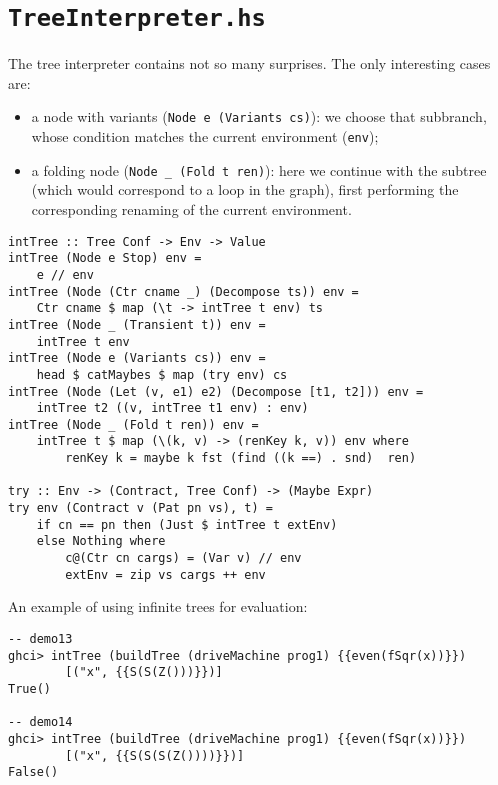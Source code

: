 \section{\texttt{TreeInterpreter.hs}}

The tree interpreter contains not so many surprises.
The only interesting cases are:
\begin{itemize}
\item a node with variants (\texttt{Node e (Variants cs)}): we choose that
subbranch, whose condition matches the current environment (\texttt{env});
\item a folding node (\texttt{Node \_ (Fold t ren)}): 
here we continue with the subtree (which would correspond to a loop in the graph),
first performing the corresponding renaming of the current environment.
\end{itemize}

\begin{lstlisting}[name=treeinterpreter]
intTree :: Tree Conf -> Env -> Value
intTree (Node e Stop) env =
	e // env
intTree (Node (Ctr cname _) (Decompose ts)) env =
	Ctr cname $ map (\t -> intTree t env) ts
intTree (Node _ (Transient t)) env =
	intTree t env
intTree (Node e (Variants cs)) env =
	head $ catMaybes $ map (try env) cs
intTree (Node (Let (v, e1) e2) (Decompose [t1, t2])) env =
	intTree t2 ((v, intTree t1 env) : env)
intTree (Node _ (Fold t ren)) env =
	intTree t $ map (\(k, v) -> (renKey k, v)) env where
		renKey k = maybe k fst (find ((k ==) . snd)  ren)

try :: Env -> (Contract, Tree Conf) -> (Maybe Expr)
try env (Contract v (Pat pn vs), t) =
	if cn == pn then (Just $ intTree t extEnv) 
	else Nothing where
		c@(Ctr cn cargs) = (Var v) // env
		extEnv = zip vs cargs ++ env
\end{lstlisting}


An example of using infinite trees for evaluation:
\begin{lstlisting}[style=demo]
-- demo13
ghci> intTree (buildTree (driveMachine prog1) {{even(fSqr(x))}}) 
        [("x", {{S(S(Z()))}})]
True()

-- demo14
ghci> intTree (buildTree (driveMachine prog1) {{even(fSqr(x))}}) 
        [("x", {{S(S(S(Z())))}})]
False()
\end{lstlisting}